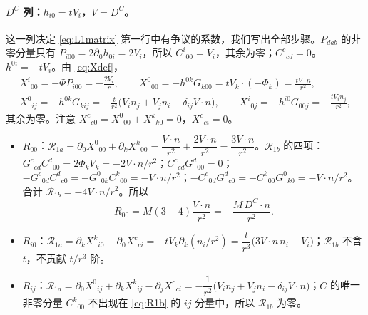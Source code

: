 \documentclass[11pt,a4paper]{ctexart}
\numberwithin{equation}{section}
\begin{document}
\paragraph{$D^C$ 列：$h_{i0}=tV_i$，$V=D^C$。}这一列决定 \eqref{eq:L1matrix} 第一行中有争议的系数，我们写出全部步骤。$P_{dab}$ 的非零分量只有 $P_{i00}=2\partial_0h_{0i}=2V_i$，所以 $C^i{}_{00}=V_i$，其余为零；$C^c{}_{cd}=0$。$h^{0i}=-tV_i$。由 \eqref{eq:Xdef}，
\begin{gather*}
X^i{}_{00}=-\Phi P_{i00}=-\frac{2V_i}{r},\qquad
X^0{}_{00}=-h^{0k}G_{k00}=tV_k\cdot(-\Phi_k)=\frac{tV\!\cdot n}{r^2},\\
X^0{}_{ij}=-h^{0k}G_{kij}=-\frac t{r^2}\big(V_in_j+V_jn_i-\delta_{ij}V\!\cdot n\big),\qquad
X^i{}_{0j}=-h^{i0}G_{00j}=-\frac{tV_in_j}{r^2},
\end{gather*}
其余为零。注意 $X^c{}_{c0}=X^0{}_{00}+X^k{}_{k0}=0$，$X^c{}_{ci}=0$。
\begin{itemize}
\item $R_{00}$：$\mathcal R_{1a}=\partial_0X^0{}_{00}+\partial_kX^k{}_{00}=\dfrac{V\!\cdot n}{r^2}+\dfrac{2V\!\cdot n}{r^2}=\dfrac{3V\!\cdot n}{r^2}$。$\mathcal R_{1b}$ 的四项：$G^c{}_{cd}C^d{}_{00}=2\Phi_kV_k=-2V\!\cdot n/r^2$；$C^c{}_{cd}G^d{}_{00}=0$；$-G^c{}_{0d}C^d{}_{c0}=-G^0{}_{0k}C^k{}_{00}=-V\!\cdot n/r^2$；$-C^c{}_{0d}G^d{}_{c0}=-C^k{}_{00}G^0{}_{k0}=-V\!\cdot n/r^2$。合计 $\mathcal R_{1b}=-4V\!\cdot n/r^2$。所以
\begin{equation}
R_{00}=M(3-4)\frac{V\!\cdot n}{r^2}=-\frac{M\,D^C\!\cdot n}{r^2}.
\label{eq:DC00}
\end{equation}
\item $R_{i0}$：$\mathcal R_{1a}=\partial_kX^k{}_{i0}-\partial_0X^c{}_{ci}=-tV_k\partial_k(n_i/r^2)=\dfrac t{r^3}\big(3V\!\cdot n\,n_i-V_i\big)$；$\mathcal R_{1b}$ 不含 $t$，不贡献 $t/r^3$ 阶。
\item $R_{ij}$：$\mathcal R_{1a}=\partial_0X^0{}_{ij}+\partial_kX^k{}_{ij}-\partial_jX^c{}_{ci}=-\dfrac1{r^2}\big(V_in_j+V_jn_i-\delta_{ij}V\!\cdot n\big)$；$C$ 的唯一非零分量 $C^k{}_{00}$ 不出现在 \eqref{eq:R1b} 的 $ij$ 分量中，所以 $\mathcal R_{1b}$ 为零。
\end{itemize}
\end{document}
